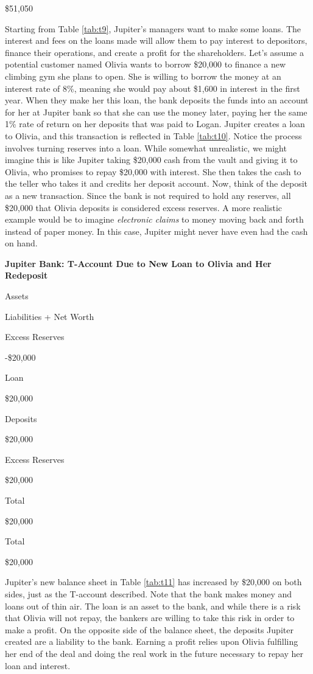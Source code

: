 \documentclass[
]{book}
\begin{document}
\$51,050

Starting from Table \ref{tab:t9}, Jupiter's managers want to make some loans. The interest and fees on the loans made will allow them to pay interest to depositors, finance their operations, and create a profit for the shareholders. Let's assume a potential customer named Olivia wants to borrow \$20,000 to finance a new climbing gym she plans to open. She is willing to borrow the money at an interest rate of 8\%, meaning she would pay about \$1,600 in interest in the first year. When they make her this loan, the bank deposits the funds into an account for her at Jupiter bank so that she can use the money later, paying her the same 1\% rate of return on her deposits that was paid to Logan. Jupiter creates a loan to Olivia, and this transaction is reflected in Table \ref{tab:t10}. Notice the process involves turning reserves into a loan. While somewhat unrealistic, we might imagine this is like Jupiter taking \$20,000 cash from the vault and giving it to Olivia, who promises to repay \$20,000 with interest. She then takes the cash to the teller who takes it and credits her deposit account. Now, think of the deposit as a new transaction. Since the bank is not required to hold any reserves, all \$20,000 that Olivia deposits is considered excess reserves. A more realistic example would be to imagine \emph{electronic claims} to money moving back and forth instead of paper money. In this case, Jupiter might never have even had the cash on hand.

\label{tab:t10}\textbf{Jupiter Bank: T-Account Due to New Loan to Olivia and Her Redeposit}

Assets

Liabilities + Net Worth

Excess Reserves

-\$20,000

Loan

\$20,000

Deposits

\$20,000

Excess Reserves

\$20,000

Total

\$20,000

Total

\$20,000

Jupiter's new balance sheet in Table \ref{tab:t11} has increased by \$20,000 on both sides, just as the T-account described. Note that the bank makes money and loans out of thin air. The loan is an asset to the bank, and while there is a risk that Olivia will not repay, the bankers are willing to take this risk in order to make a profit. On the opposite side of the balance sheet, the deposits Jupiter created are a liability to the bank. Earning a profit relies upon Olivia fulfilling her end of the deal and doing the real work in the future necessary to repay her loan and interest.
\end{document}
